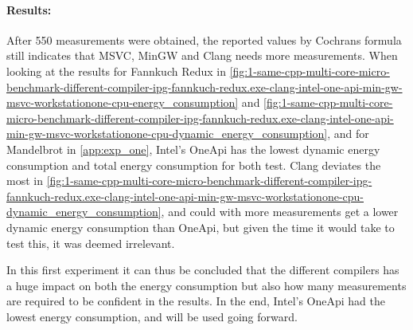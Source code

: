 \paragraph{Results:} After 550 measurements were obtained, the reported values by Cochrans formula still indicates that MSVC, MinGW and Clang needs more measurements. When looking at the results for Fannkuch Redux in \cref{fig:1-same-cpp-multi-core-micro-benchmark-different-compiler-ipg-fannkuch-redux.exe-clang-intel-one-api-min-gw-msvc-workstationone-cpu-energy_consumption} and \cref{fig:1-same-cpp-multi-core-micro-benchmark-different-compiler-ipg-fannkuch-redux.exe-clang-intel-one-api-min-gw-msvc-workstationone-cpu-dynamic_energy_consumption}, and for Mandelbrot in \cref{app:exp_one}, Intel's OneApi has the lowest dynamic energy consumption and total energy consumption for both test. Clang deviates the most in \cref{fig:1-same-cpp-multi-core-micro-benchmark-different-compiler-ipg-fannkuch-redux.exe-clang-intel-one-api-min-gw-msvc-workstationone-cpu-dynamic_energy_consumption}, and could with more measurements get a lower dynamic energy consumption than OneApi, but given the time it would take to test this, it was deemed irrelevant.

In this first experiment it can thus be concluded that the different compilers has a huge impact on both the energy consumption but also how many measurements are required to be confident in the results. In the end, Intel's OneApi had the lowest energy consumption, and will be used going forward.


